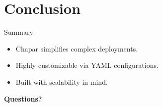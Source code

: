 \documentclass[aspectratio=169]{beamer}
\begin{document}
\section{Conclusion}

\begin{frame}{Summary}
    \begin{itemize}
        \item Chapar simplifies complex deployments.
        \item Highly customizable via YAML configurations.
        \item Built with scalability in mind.
    \end{itemize}
    \vspace{1cm}
    \begin{center}
        \Large \textbf{Questions?}
    \end{center}
\end{frame}
\end{document}

